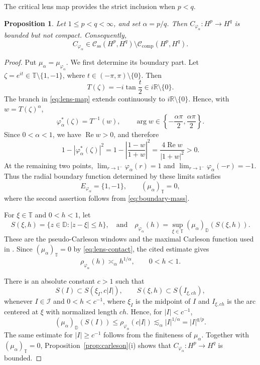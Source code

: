 \documentclass[11pt, reqno]{amsart}
\newtheorem{proposition}[theorem]{Proposition}
\theoremstyle{definition}
\theoremstyle{remark}
\newcommand{\D}{\mathbb{D}}
\newcommand{\T}{\mathbb{T}}
\newcommand{\CK}{\mathcal C_{\mathrm{comp}}}
\newcommand{\CS}{\mathcal C_{\mathrm{ss}}}
\begin{document}
The critical lens map provides the strict inclusion when \(p<q\).

\begin{proposition}
\label{prop:lens-example}
Let \(1\le p<q<\infty\), and set \(\alpha=p/q\). Then
\(C_{\varphi_\alpha}:H^p\to H^q\) is bounded but not compact.
Consequently,
\[
        C_{\varphi_\alpha}
        \in
        \CS(H^p,H^q)\setminus\CK(H^p,H^q).
\]
\end{proposition}

\begin{proof}
Put \(\mu_\alpha=\mu_{\varphi_\alpha}\). We first determine its
boundary part. Let \(\zeta=e^{it}\in\T\setminus\{1,-1\}\), where
\(t\in(-\pi,\pi)\setminus\{0\}\). Then
\[
        T(\zeta)
        =
        -i\tan\frac{t}{2}
        \in i\mathbb R\setminus\{0\}.
\]
The branch in \eqref{eq:lens-map} extends continuously to
\(i\mathbb R\setminus\{0\}\). Hence, with \(w=T(\zeta)^\alpha\),
\[
        \varphi_\alpha^*(\zeta)=T^{-1}(w),
        \qquad
        \arg w\in
        \left\{-\frac{\alpha\pi}{2},\frac{\alpha\pi}{2}\right\}.
\]
Since \(0<\alpha<1\), we have \(\operatorname{Re}w>0\), and therefore
\[
        1-\left|\varphi_\alpha^*(\zeta)\right|^2
        =
        1-\left|\frac{1-w}{1+w}\right|^2
        =
        \frac{4\operatorname{Re}w}{|1+w|^2}
        >0.
\]
At the remaining two points,
\(\lim_{r\to1^-}\varphi_\alpha(r)=1\) and
\(\lim_{r\to1^-}\varphi_\alpha(-r)=-1\). Thus the radial boundary
function determined by these limits satisfies
\begin{equation}
\label{eq:lens-contact}
        E_{\varphi_\alpha}=\{1,-1\},
        \qquad
        (\mu_\alpha)_\T=0,
\end{equation}
where the second assertion follows from
\eqref{eq:boundary-mass}.

For \(\xi\in\T\) and \(0<h<1\), let
\[
        S(\xi,h)=\{z\in\D:|z-\xi|\le h\},
        \quad\text{and}\quad
        \rho_{\varphi_\alpha}(h)
        =
        \sup_{\xi\in\T}(\mu_\alpha)_\D(S(\xi,h)).
\]
These are the pseudo-Carleson windows and the maximal Carleson
function used in
\cite[(3.1), Lemma~3.3]{LefevreLiQueffelecRodriguezPiazza2013Lens}.
Since \((\mu_\alpha)_\T=0\) by
\eqref{eq:lens-contact}, the cited estimate gives
\[
        \rho_{\varphi_\alpha}(h)
        \asymp_\alpha
        h^{1/\alpha},
        \qquad
        0<h<1.
\]

There is an absolute constant \(c>1\) such that
\begin{equation}
\label{eq:box-window}
        S(I)\subset S(\xi_I,c|I|),
        \qquad
        S(\xi,h)\subset S(I_{\xi,ch}),
\end{equation}
whenever \(I\in\mathcal I\) and \(0<h<c^{-1}\), where \(\xi_I\) is
the midpoint of \(I\) and \(I_{\xi,ch}\) is the arc centered at
\(\xi\) with normalized length \(ch\). Hence, for \(|I|<c^{-1}\),
\[
        (\mu_\alpha)_\D(S(I))
        \le
        \rho_{\varphi_\alpha}(c|I|)
        \lesssim_\alpha
        |I|^{1/\alpha}
        =
        |I|^{q/p}.
\]
The same estimate for \(|I|\ge c^{-1}\) follows from the finiteness of
\(\mu_\alpha\). Together with \((\mu_\alpha)_\T=0\),
Proposition~\ref{prop:carleson}\textup{(i)} shows that
\(C_{\varphi_\alpha}:H^p\to H^q\) is bounded.


\end{proof}
\end{document}

